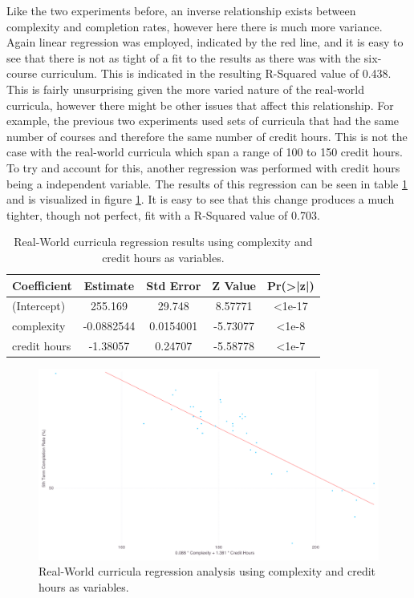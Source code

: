 \documentclass[botnum, fleqn]{unmeethesis}
\begin{document}
    Like the two experiments before, an inverse relationship exists between complexity and completion rates, however here there is much more variance. Again linear regression was employed, indicated by the red line, and it is easy to see that there is not as tight of a fit to the results as there was with the six-course curriculum. This is indicated in the resulting R-Squared value of 0.438. This is fairly unsurprising given the more varied nature of the real-world curricula, however there might be other issues that affect this relationship. For example, the previous two experiments used sets of curricula that had the same number of courses and therefore the same number of credit hours. This is not the case with the real-world curricula which span a range of 100 to 150 credit hours. To try and account for this, another regression was performed with credit hours being a independent variable. The results of this regression can be seen in table \ref{tab:webCH} and is visualized in figure \ref{fig:wbcompch}. It is easy to see that this change produces a much tighter, though not perfect, fit with a R-Squared value of 0.703.

    \begin{table}[!h]
      \centering
      \caption{Real-World curricula regression results using complexity and credit hours as variables.}
      \label{tab:webCH}
      \begin{tabular}{l*{4}{c}}
        Coefficient   & Estimate    & Std Error & Z Value   & Pr(>|z|)  \\
        \hline
        (Intercept)   & 255.169     & 29.748    & 8.57771   & <1e-17    \\
        complexity    & -0.0882544  & 0.0154001 & -5.73077  & <1e-8     \\
        credit hours  & -1.38057    & 0.24707   & -5.58778  & <1e-7     \\
      \end{tabular}
    \end{table}

    \begin{figure}[h!]
      \centerline{\includegraphics[scale=0.25]{./figures/comp_ch_plot.png}}
      \caption{Real-World curricula regression analysis using complexity and credit hours as variables.} 
      \label{fig:wbcompch}
    \end{figure}
\end{document}
